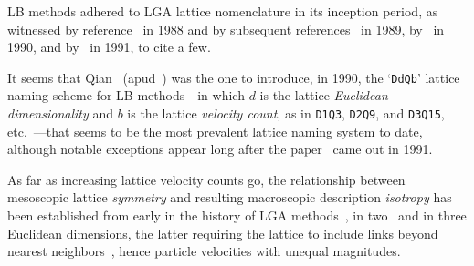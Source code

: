     LB   methods   adhered    to    LGA    lattice    nomenclature    in    its    inception    period,    as    witnessed    by
    reference~\cite{1988-McNamaraGR+ZanettiG-PhysRevLett}          in          1988          and          by          subsequent
    references~\cite{1989-HigueraFJ+JimenezJ-EurophysLett,         1989-HigueraFJ+SucciS-EurophysLett}         in          1989,
    by~\cite{1990-BenziR+VergassolaM-EurophysLett,   1990-BenziR+VergassolaM-NuclPhysB,    1990-CancelliereA+SucciS-PhysFluidsA,
    1990-VergassolaM+SucciS-EurophysLett}   in   1990,   and   by~\cite{1991-CornubertR+LevermoreD-PhysD,    1991-ErnstMH-PhysD,
    1991-FrischU-PhysD, 1991-GunstensenAK+ZanettiG-PhysRevA, 1991-SucciS+BenziR-PhysRevA} in 1991, to cite a few.

    It seems that Qian~\cite{1990-QianYH-Paris} (apud~\cite[p.~235]{1993-QianYH-JSciComput}) was the one to introduce, in  1990,
    the `\texttt{DdQb}' lattice naming scheme for LB methods---in which $d$ is the lattice \emph{Euclidean  dimensionality}  and
    $b$   is   the   lattice   \emph{velocity   count},   as    in    \texttt{D1Q3},    \texttt{D2Q9},    and    \texttt{D3Q15},
    etc.~\cite{1992-QianYH+LallemandP-EurophysLett}---that seems to be  the  most  prevalent  lattice  naming  system  to  date,
    although notable exceptions appear long after the paper~\cite{1991-QianYH+LallemandP-AdvKinTheoContMech} came out in 1991.

    As far as increasing lattice velocity counts go, the relationship between mesoscopic lattice \emph{symmetry}  and  resulting
    macroscopic   description   \emph{isotropy}   has   been   established    from    early    in    the    history    of    LGA
    methods~\cite{1973-HardyJ+PazzisO-JMathPhys, 1976-HardyJ+PomeauY-PhysRevA},  in  two~\cite{1986-FrischU+PomeauY-PhysRevLett}
    and  in  three  Euclidean   dimensions,   the   latter   requiring   the   lattice   to   include   links   beyond   nearest
    neighbors~\cite[pp.~473,490]{1986-WolframS-JStatPhys}, hence particle velocities with unequal magnitudes.

